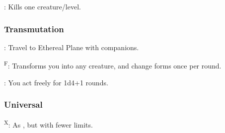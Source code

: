 	: Kills one creature/level.

\subsubsection{Transmutation}
	: Travel to Ethereal Plane with companions.

	\textsuperscript{F}: Transforms you into any creature, and change forms once per round.

	: You act freely for 1d4+1 rounds.

\subsubsection{Universal}
	\textsuperscript{X}: As , but with fewer limits.